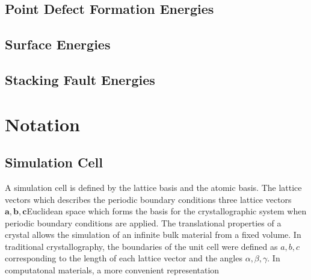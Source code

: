 \subsection{Point Defect Formation Energies}
\subsection{Surface Energies}
\subsection{Stacking Fault Energies}

\section{Notation}
\subsection{Simulation Cell}
A simulation cell is defined by the lattice basis and the atomic basis.  The lattice vectors which describes the periodic boundary conditions three lattice vectors $\bm{a},\bm{b},\bm{c}$Euclidean space which forms the basis for the crystallographic system when periodic boundary conditions are applied.  The translational properties of a crystal allows the simulation of an infinite bulk material from a fixed volume.  In traditional crystallography, the boundaries of the unit cell were defined as $a,b,c$ corresponding to the length of each lattice vector and the angles $\alpha,\beta,\gamma$.  In computatonal materials, a more convenient representation

